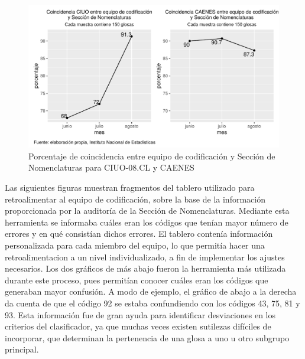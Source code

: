 \documentclass[
  12pt,
  spanish,
]{article}
\begin{document}
\begin{figure}[H]
\centering
\large
\caption{Porcentaje de coincidencia entre equipo de codificación y Sección de Nomenclaturas para CIUO-08.CL y CAENES}
\label{div_ic_nac}
\includegraphics[width = \linewidth]{imagenes/auditorias_parciales.pdf}
\normalsize
\end{figure}

Las siguientes figuras muestran fragmentos del tablero utilizado para
retroalimentar al equipo de codificación, sobre la base de la
información proporcionada por la auditoría de la Sección de
Nomenclaturas. Mediante esta herramienta se informaba cuáles eran los
códigos que tenían mayor número de errores y en qué consistían dichos
errores. El tablero contenía información personalizada para cada miembro
del equipo, lo que permitía hacer una retroalimentacion a un nivel
individualizado, a fin de implementar los ajustes necesarios. Los dos
gráficos de más abajo fueron la herramienta más utilizada durante este
proceso, pues permitían conocer cuáles eran los códigos que generaban
mayor confusión. A modo de ejemplo, el gráfico de abajo a la derecha da
cuenta de que el código 92 se estaba confundiendo con los códigos 43,
75, 81 y 93. Esta información fue de gran ayuda para identificar
desviaciones en los criterios del clasificador, ya que muchas veces
existen sutilezas difíciles de incorporar, que determinan la pertenencia
de una glosa a uno u otro subgrupo principal.
\end{document}
